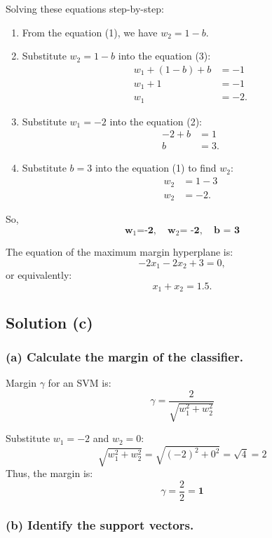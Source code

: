 \documentclass{article}
\begin{document}
Solving these equations step-by-step:
\begin{enumerate}
    \item From the equation (1), we have $w_2 = 1 - b$.
    \item Substitute $w_2 = 1 - b$ into the equation (3):
    \begin{align*}
        w_1 + (1 - b) + b &= -1 \\
        w_1 + 1 &= -1 \\
        w_1 &= -2.
    \end{align*}
    \item Substitute $w_1 = -2$ into the equation (2):
    \begin{align*}
        -2 + b &= 1 \\
        b &= 3.
    \end{align*}
    \item Substitute $b = 3$ into the equation (1) to find $w_2$:
    \begin{align*}
        w_2 &= 1 - 3 \\
        w_2 &= -2.
    \end{align*}
\end{enumerate}

So,
\[
\textbf{w}_1 \textbf{=} \textbf{-2}, \quad \textbf{w}_2 \textbf{= -2}, \quad \textbf{b = 3}
\]

The equation of the maximum margin hyperplane is:
\[
-2x_1 - 2x_2 + 3 = 0,
\]
or equivalently:
\[
x_1 + x_2 = 1.5.
\]

\vspace{10pt}
\subsection*{Solution (c)}
\subsubsection*{(a) Calculate the margin of the classifier.}

Margin \( \gamma \) for an SVM is:
\[
\gamma = \frac{2}{\sqrt{w_1^2 + w_2^2}}
\]

\hspace{-18pt}
Substitute \( w_1 = -2 \) and \( w_2 = 0 \):
\[
\sqrt{w_1^2 + w_2^2} = \sqrt{(-2)^2 + 0^2} = \sqrt{4} = 2
\]
Thus, the margin is:
\[
\gamma = \frac{2}{2} = \textbf{1}
\]

\subsubsection*{(b) Identify the support vectors.}
\end{document}

